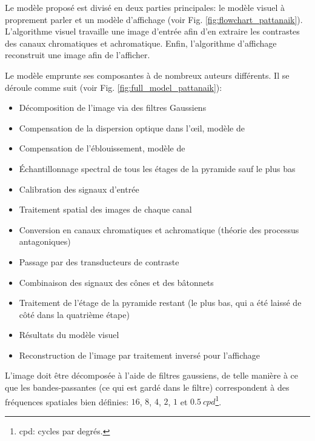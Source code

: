 	\par Le modèle proposé est divisé en deux parties principales: le modèle visuel à proprement parler et un modèle d'affichage (voir Fig. \ref{fig:flowchart_pattanaik}). L'algorithme visuel travaille une image d'entrée afin d'en extraire les contrastes des canaux chromatiques et achromatique. Enfin, l'algorithme d'affichage reconstruit une image afin de l'afficher.
	
	\par Le modèle emprunte ses composantes à de nombreux auteurs différents. Il se déroule comme suit (voir Fig. \ref{fig:full_model_pattanaik}):
	\begin{itemize}
		\item Décomposition de l'image via des filtres Gaussiens
		\item Compensation de la dispersion optique dans l'œil, modèle de \citep{westheimer_eye_1986}
		\item Compensation de l'éblouissement, modèle de \citep{spencer_physically-based_1995}
		\item Échantillonnage spectral de tous les étages de la pyramide sauf le plus bas \citep{fairchild_color_1998,wyszecki_color_2000}
		\item Calibration des signaux d'entrée
		\item Traitement spatial des images de chaque canal \citep{burt_laplacian_1983, peli_contrast_1990}
		\item Conversion en canaux chromatiques et achromatique (théorie des processus antagoniques) \citep{hunt_reproduction_1995,fairchild_color_1998}
		\item Passage par des transducteurs de contraste \citep{watson_model_1997}
		\item Combinaison des signaux des cônes et des bâtonnets
		\item Traitement de l'étage de la pyramide restant (le plus bas, qui a été laissé de côté dans la quatrième étape) \citep{fairchild_color_1998}
		\item Résultats du modèle visuel
		\item Reconstruction de l'image par traitement inversé pour l'affichage
	\end{itemize}
	
	\par L'image doit être décomposée à l'aide de filtres gaussiens, de telle manière à ce que les bandes-passantes (ce qui est gardé dans le filtre) correspondent à des fréquences spatiales bien définies: $16$, $8$, $4$, $2$, $1$ et $0.5~cpd$\footnote{cpd: cycles par degrés.}.
	
